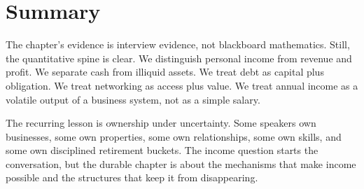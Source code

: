 \section{Summary}

The chapter's evidence is interview evidence, not blackboard mathematics. Still, the quantitative spine is clear. We distinguish personal income from revenue and profit. We separate cash from illiquid assets. We treat debt as capital plus obligation. We treat networking as access plus value. We treat annual income as a volatile output of a business system, not as a simple salary.

The recurring lesson is ownership under uncertainty. Some speakers own businesses, some own properties, some own relationships, some own skills, and some own disciplined retirement buckets. The income question starts the conversation, but the durable chapter is about the mechanisms that make income possible and the structures that keep it from disappearing.
